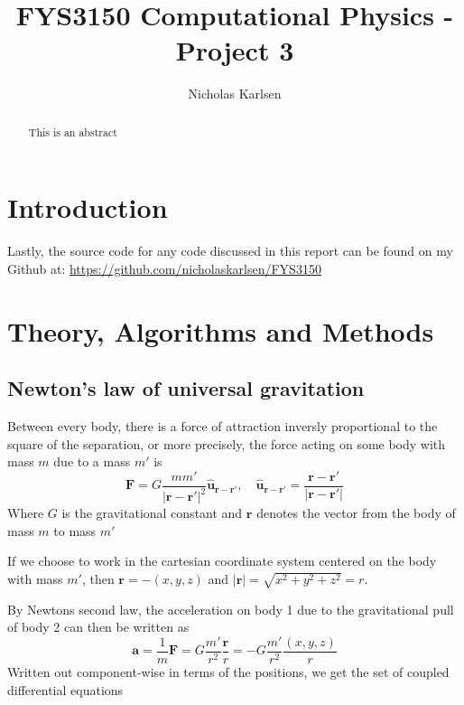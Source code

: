 \documentclass[10pt,showpacs,preprintnumbers,footinbib,amsmath,amssymb,aps,prl,twocolumn,groupedaddress,superscriptaddress,showkeys]{revtex4-1}
\begin{document}
\title{FYS3150 Computational Physics - Project 3}
\author{Nicholas Karlsen}

\begin{abstract}
This is an abstract
\end{abstract}

\maketitle

\section{Introduction}
  
  Lastly, the source code for any code discussed in this report can be found on my
  Github at: \url{https://github.com/nicholaskarlsen/FYS3150}

\section{Theory, Algorithms and Methods}
  
  \subsection{Newton's law of universal gravitation}
    Between every body, there is a force of attraction inversly proportional to the square of the separation, or more precisely, the force acting on some body with mass $m$ due to a mass $m'$ is
    \begin{equation}
      \mathbf F = G\frac{m m'}{|\mathbf r - \mathbf r'|^2}\mathbf{\hat{u}_{r-r'}}, \quad \mathbf{\hat{u}_{r-r'}} = \frac{\mathbf r - \mathbf r'}{\mathbf |\mathbf r - \mathbf r'|}
    \end{equation}
    Where $G$ is the gravitational constant and $\mathbf r$ denotes the vector from the body of mass $m$ to mass $m'$

    If we choose to work in the cartesian coordinate system centered on the body with mass $m'$, then $\mathbf r = -(x, y, z)$ and $|\mathbf r| = \sqrt{x^2 + y^2 + z^2} = r$.

    By Newtons second law, the acceleration on body 1 due to the gravitational pull of body 2 can then be written as
    \begin{equation}
      \mathbf a = \frac{1}{m}\mathbf F = G \frac{m'}{r^2}\frac{\mathbf r}{r} = -G\frac{m'}{r^2}\frac{\left(x, y, z\right)}{r}
    \end{equation}
    Written out component-wise in terms of the positions, we get the set of coupled differential equations
\end{document}
